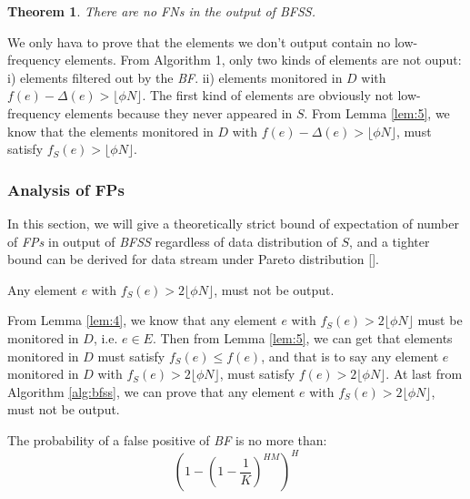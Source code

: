\documentclass[conference]{IEEEtran}
\begin{document}
\newtheorem{theorem}{Theorem}
\begin{theorem}\label{thm:1}
	There are no \emph{FNs} in the output of \emph{BFSS}.
\end{theorem}

\begin{IEEEproof}
We only hava to prove that the elements we don't output contain no low-frequency elements. From Algorithm 1, only two kinds of elements are not ouput: i) elements filtered out by the \emph{BF}. ii) elements monitored in $D$ with $f(e)-\Delta(e)>\lfloor \phi N\rfloor$. The first kind of elements are obviously not low-frequency elements because they never appeared in $S$. From Lemma \ref{lem:5}, we know that the elements monitored in $D$ with $f(e)-\Delta(e)>\lfloor \phi N\rfloor$, must satisfy $f_S(e)>\lfloor \phi N\rfloor$. 
\end{IEEEproof}

\subsubsection{\textbf{Analysis of FPs}}
In this section, we will give a theoretically strict bound of expectation of number of \emph{FPs} in output of \emph{BFSS} regardless of data distribution of $S$, and a tighter bound can be derived for data stream under Pareto distribution [].

\begin{lemma}\label{lem:6}
	 Any element $e$ with $f_S(e)>2\lfloor \phi N\rfloor$, must not be output.
\end{lemma}

\begin{IEEEproof}
From Lemma \ref{lem:4}, we know that any element $e$ with $f_S(e)>2\lfloor \phi N\rfloor$ must be monitored in $D$, i.e. $e\in E$. Then from Lemma \ref{lem:5}, we can get that elements monitored in $D$ must satisfy $f_S(e)\leq f(e)$, and that is to say any element $e$ monitored in $D$ with $f_S(e)>2\lfloor \phi N\rfloor$, must satisfy $f(e)>2\lfloor \phi N\rfloor$. At last from Algorithm \ref{alg:bfss}, we can prove that any element $e$ with $f_S(e)>2\lfloor \phi N\rfloor$, must not be output.
\end{IEEEproof}

\begin{lemma}\label{lem:7}
The probability of a false positive of \emph{BF} is no more than:
\begin{equation}
(1-(1-\frac{1}{K})^{HM})^H
\end{equation}
\end{lemma}
\end{document}
